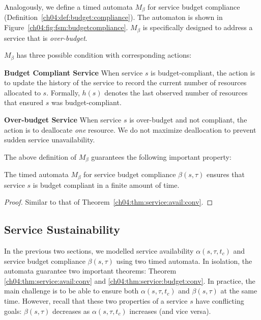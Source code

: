 Analogously, we define a timed automata $M_\beta$ for service budget compliance (Definition~\ref{ch04:def:budget:compliance}). The automaton is shown in Figure~\ref{ch04:fig:fsm:budgetcompliance}.  $M_\beta$ is specifically designed to address a service that is \emph{over-budget}.
% 

$M_\beta$ has three possible condition with corresponding actions:

\textbf{Budget Compliant Service}
  When service $s$ is budget-compliant, the action is to update the history of the service to record the current number of resources allocated to $s$. 
  Formally, $h(s)$ denotes the last observed number of resources that ensured $s$ was budget-compliant.

\textbf{Over-budget Service}
  When service $s$ is over-budget and not compliant, the action is to deallocate \emph{one} resource.
  We do not maximize deallocation to prevent sudden service unavailability.

The above definition of $M_\beta$ guarantees the following important property:

\begin{defn}
\label{ch04:thm:service:budget:conv}
The timed automata $M_\beta$ for service budget compliance $\beta(s,\tau)$ ensures that service $s$ is budget compliant in a finite amount of time.
\end{defn}

\begin{proof}%
Similar to that of Theorem~\ref{ch04:thm:service:avail:conv}.
\end{proof}

\subsection{Service Sustainability}
\label{ch04:sec:service:sustain}

In the previous two sections, we modelled service availability $\alpha(s,\tau,t_c)$ and service budget compliance $\beta(s,\tau)$ using two timed automata.
In isolation, the automata guarantee two important theorems: Theorem \ref{ch04:thm:service:avail:conv} and \ref{ch04:thm:service:budget:conv}.
In practice, the main challenge is to be able to ensure both $\alpha(s,\tau,t_c)$ and $\beta(s,\tau)$ at the same time.
However, recall that these two properties of a service $s$ have conflicting goals: $\beta(s,\tau)$ decreases as $\alpha(s,\tau,t_c)$ increases (and vice versa).
